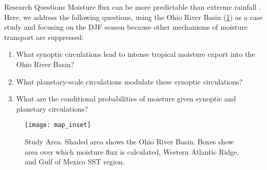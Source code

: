 \begin{block}{Research Questions}
    Moisture flux can be more predictable than extreme rainfall \cite{Lavers2016}.
    Here, we address the following questions, using the Ohio River Basin (\cref{fig:study-area}) as a case study and focusing on the DJF season because other mechanisms of moisture transport are suppressed:
    \begin{enumerate}
        \item What synoptic circulations lead to intense tropical moisture export into the Ohio River Basin?
        \item What planetary-scale circulations modulate these synoptic circulations?
        \item What are the conditional probabilities of moisture given synoptic and planetary circulations?
    \end{enumerate}
    \begin{figure}
        \centering
        \texttt{[image: map\_inset]}
        \caption{Study Area. Shaded area shows the Ohio River Basin. Boxes show area over which moisture flux is calculated, Western Atlantic Ridge, and Gulf of Mexico SST region.}
        \label{fig:study-area}
    \end{figure}
\end{block}
